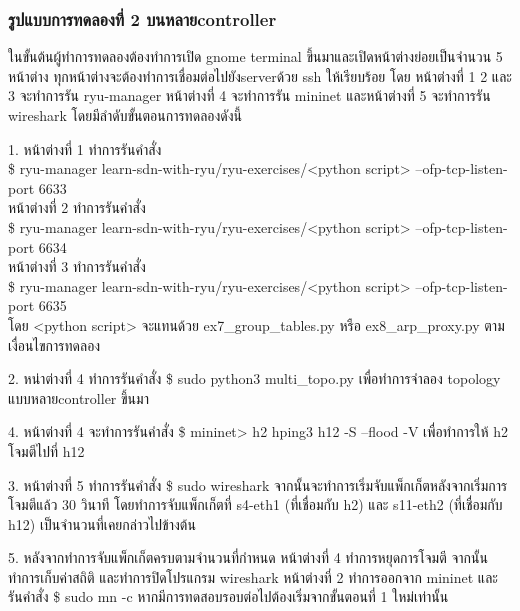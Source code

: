 \subsubsection*{รูปแบบการทดลองที่ 2 บนหลาย\gls{controller}}

ในขั้นต้นผู้ทำการทดลองต้องทำการเปิด gnome terminal ขึ้นมาและเปิดหน้าต่างย่อยเป็นจำนวน 5 หน้าต่าง
ทุกหน้าต่างจะต้องทำการเชื่อมต่อไปยัง\gls{server}ด้วย ssh ให้เรียบร้อย
โดย หน้าต่างที่ 1 2 และ 3 จะทำการรัน ryu-manager หน้าต่างที่ 4 จะทำการรัน mininet และหน้าต่างที่ 5 จะทำการรัน wireshark
โดยมีลำดับขั้นตอนการทดลองดังนี้

1. หน้าต่างที่ 1 ทำการรันคำสั่ง \\
\$ ryu-manager learn-sdn-with-ryu/ryu-exercises/<python script> --ofp-tcp-listen-port 6633 \\
\indent หน้าต่างที่ 2 ทำการรันคำสั่ง \\
\$ ryu-manager learn-sdn-with-ryu/ryu-exercises/<python script> --ofp-tcp-listen-port 6634  \\
\indent หน้าต่างที่ 3 ทำการรันคำสั่ง \\
\$ ryu-manager learn-sdn-with-ryu/ryu-exercises/<python script> --ofp-tcp-listen-port 6635  \\
โดย <python script> จะแทนด้วย 
ex7\_group\_tables.py หรือ ex8\_arp\_proxy.py
ตามเงื่อนไขการทดลอง

2. หน่าต่างที่ 4 ทำการรันคำสั่ง    
\$ sudo python3 multi\_topo.py เพื่อทำการจำลอง topology แบบหลาย\gls{controller} ขึ้นมา

4. หน้าต่างที่ 4 จะทำการรันคำสั่ง \$ mininet> h2 hping3 h12 -S --flood -V
เพื่อทำการให้ h2 โจมตีไปที่ h12

3. หน้าต่างที่ 5 ทำการรันคำสั่ง 
\$ sudo wireshark 
จากนั้นจะทำการเริ่มจับแพ็กเก็ตหลังจากเริ่มการโจมตีแล้ว 30 วินาที
โดยทำการจับแพ็กเก็ตที่ s4-eth1 (ที่เชื่อมกับ h2) และ s11-eth2 (ที่เชื่อมกับ h12) เป็นจำนวนที่เคยกล่าวไปข้างต้น

5. หลังจากทำการจับแพ็กเก็ตครบตามจำนวนที่กำหนด หน้าต่างที่ 4 ทำการหยุดการโจมตี จากนั้นทำการเก็บค่าสถิติ และทำการปิดโปรแกรม wireshark
หน้าต่างที่ 2 ทำการออกจาก mininet และรันคำสั่ง \$ sudo mn -c หากมีการทดสอบรอบต่อไปต้องเริ่มจากขั้นตอนที่ 1 ใหม่เท่านั้น
\\\\

